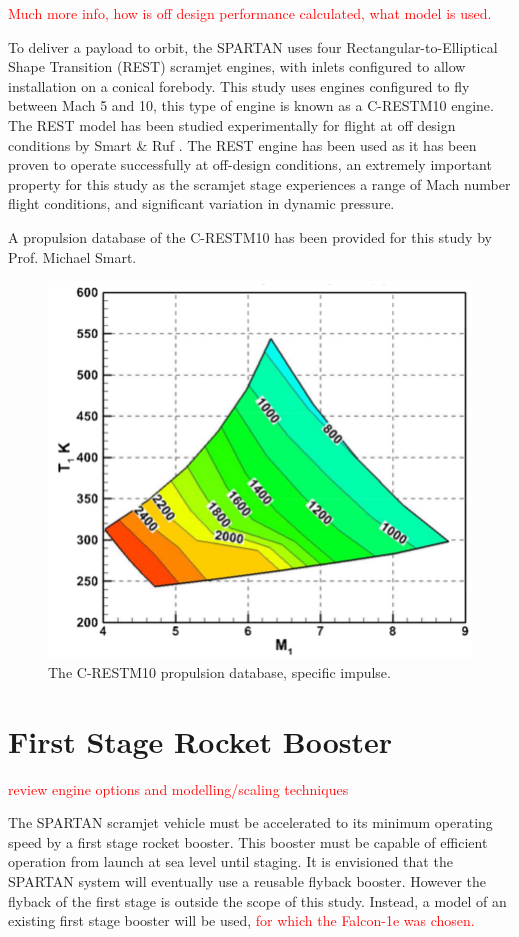 \textcolor{red}{Much more info, how is off design performance calculated, what model is used.}

To deliver a payload to orbit, the SPARTAN uses four Rectangular-to-Elliptical Shape Transition (REST) scramjet engines, with inlets configured to allow installation on a conical forebody. This study uses engines configured to fly between Mach 5 and 10, this type of engine is known as a C-RESTM10 engine\cite{Preller2017}. The REST model has been studied experimentally for flight at off design conditions by Smart \& Ruf \cite{Smart2006}. The REST engine has been used as it has been proven to operate successfully at off-design conditions, an extremely important property for this study as the scramjet stage experiences a range of Mach number flight conditions, and significant variation in dynamic pressure.  

A propulsion database of the C-RESTM10 has been provided for this study by Prof. Michael Smart.
\begin{figure}
\centering
\includegraphics[width=0.7\linewidth]{figures/2_literature-review/C-REST}
\caption{The C-RESTM10 propulsion database, specific impulse.}
\label{fig:C-REST}
\end{figure}



\section{First Stage Rocket Booster}
\textcolor{red}{review engine options and modelling/scaling techniques}

The SPARTAN scramjet vehicle must be accelerated to its minimum operating speed by a first stage rocket booster. This booster must be capable of efficient operation from launch at sea level until staging. It is envisioned that the SPARTAN system will eventually use a reusable flyback booster\cite{Preller2017}. However the flyback of the first stage is outside the scope of this study. Instead, a model of an existing first stage booster will be used,\textcolor{red}{ for which the Falcon-1e was chosen.}


